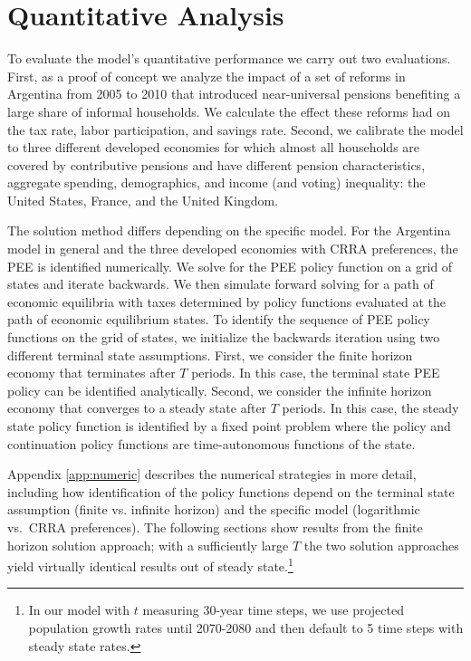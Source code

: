\section{Quantitative Analysis}\label{sec:quant}
To evaluate the model's quantitative performance we carry out two evaluations. First, as a proof of concept we analyze the impact of a set of reforms in Argentina from 2005 to 2010 that introduced near-universal pensions benefiting a large share of informal households. We calculate the effect these reforms had on the tax rate, labor participation, and savings rate. Second, we calibrate the model to three different developed economies for which almost all households are covered by contributive pensions and have different pension characteristics, aggregate spending, demographics, and income (and voting) inequality: the United States, France, and the United Kingdom.


The solution method differs depending on the specific model. For the Argentina model in general and the three developed economies with CRRA preferences, the PEE is identified numerically. We solve for the PEE policy function on a grid of states and iterate backwards. We then simulate forward solving for a path of economic equilibria with taxes determined by policy functions evaluated at the path of economic equilibrium states. To identify the sequence of PEE policy functions on the grid of states, we initialize the backwards iteration using two different terminal state assumptions. First, we consider the finite horizon economy that terminates after $T$ periods. In this case, the terminal state PEE policy can be identified analytically. Second, we consider the infinite horizon economy that converges to a steady state after $T$ periods. In this case, the steady state policy function is identified by a fixed point problem where the policy and continuation policy functions are time-autonomous functions of the state. 

Appendix \ref{app:numeric} describes the numerical strategies in more detail, including how identification of the policy functions depend on the terminal state assumption (finite vs. infinite horizon) and the specific model (logarithmic vs.\ CRRA preferences). The following sections show results from the finite horizon solution approach; with a sufficiently large $T$ the two solution approaches yield virtually identical results out of steady state.\footnote{In our model with $t$ measuring 30-year time steps, we use projected population growth rates until 2070-2080 and then default to 5 time steps with steady state rates.} 

